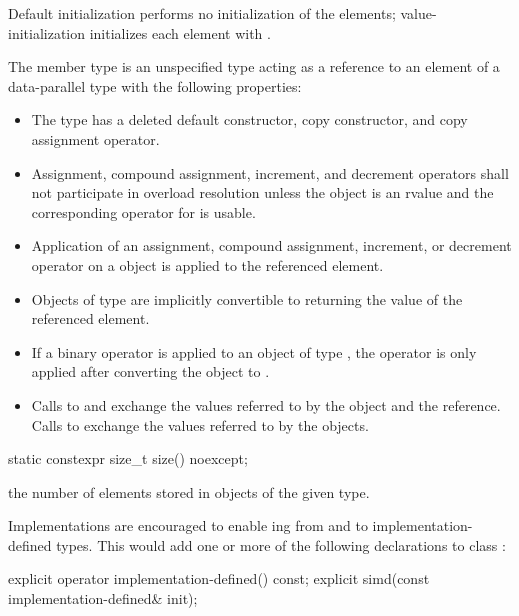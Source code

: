 \pnum Default initialization performs no initialization of the elements; value-initialization initializes each element with .

\pnum The member type  is an unspecified type acting as a reference to an element of a data-parallel type with the following properties:
\label{sec:reference type}
\begin{itemize}
  \item The type has a deleted default constructor, copy constructor, and copy assignment operator.

  \item Assignment, compound assignment, increment, and decrement operators shall not participate in overload resolution unless the  object is an rvalue and the corresponding operator for  is usable.

  \item Application of an assignment, compound assignment, increment, or decrement operator on a  object is applied to the referenced element.

  \item Objects of type  are implicitly convertible to  returning the value of the referenced element.

  \item If a binary operator is applied to an object of type , the operator is only applied after converting the  object to .

  \item Calls to  and  exchange the values referred to by the  object and the  reference.
  Calls to  exchange the values referred to by the  objects.
\end{itemize}

\begin{itemdecl}
static constexpr size_t size() noexcept;
\end{itemdecl}
\begin{itemdescr}
  \pnum\returns the number of elements stored in objects of the given \simd[<T, Abi>] type.
\end{itemdescr}

\pnum\begin{noteEnv} Implementations are encouraged to enable ing from and to implementation-defined types.
This would add one or more of the following declarations to class \simd:
\begin{itemdecl}
explicit operator implementation-defined() const;
explicit simd(const implementation-defined& init);
\end{itemdecl}
\end{noteEnv}

